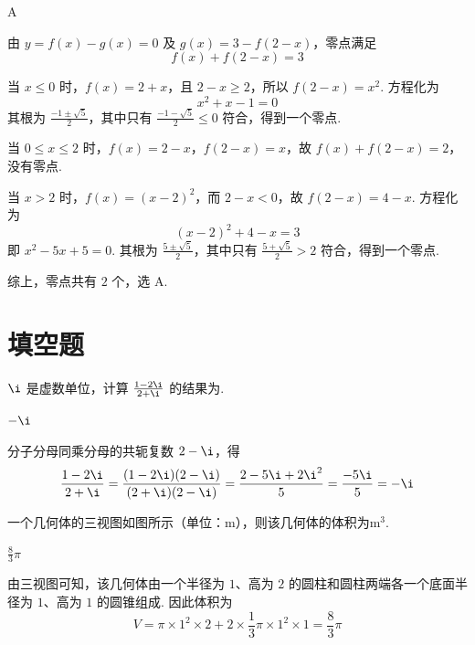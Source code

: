\begin{answer}
A
\end{answer}

\begin{solution}
由 \(y=f(x)-g(x)=0\) 及 \(g(x)=3-f(2-x)\)，零点满足
\[
f(x)+f(2-x)=3
\]

当 \(x\leqslant0\) 时，\(f(x)=2+x\)，且 \(2-x\geqslant2\)，所以 \(f(2-x)=x^2\). 方程化为
\[
x^2+x-1=0
\]
其根为 \(\frac{-1\pm\sqrt5}{2}\)，其中只有 \(\frac{-1-\sqrt5}{2}\leqslant0\) 符合，得到一个零点.

当 \(0\leqslant x\leqslant2\) 时，\(f(x)=2-x\)，\(f(2-x)=x\)，故 \(f(x)+f(2-x)=2\)，没有零点.

当 \(x>2\) 时，\(f(x)=(x-2)^2\)，而 \(2-x<0\)，故 \(f(2-x)=4-x\). 方程化为
\[
(x-2)^2+4-x=3
\]
即 \(x^2-5x+5=0\). 其根为 \(\frac{5\pm\sqrt5}{2}\)，其中只有 \(\frac{5+\sqrt5}{2}>2\) 符合，得到一个零点.

综上，零点共有 \(2\) 个，选 A.
\end{solution}

\section{填空题}

\begin{problem}
\(\i\) 是虚数单位，计算 \( \frac{1-2\i}{2+\i} \) 的结果为\fillinblank{}.
\end{problem}

\begin{answer}
\(-\i\)
\end{answer}

\begin{solution}
分子分母同乘分母的共轭复数 \(2-\i\)，得
\[
\frac{1-2\i}{2+\i}=\frac{(1-2\i)(2-\i)}{(2+\i)(2-\i)}=\frac{2-5\i+2\i^2}{5}=\frac{-5\i}{5}=-\i
\]
\end{solution}

\begin{problem}
一个几何体的三视图如图所示（单位：\(\mathrm{m}\)），则该几何体的体积为\fillinblank{}\(\mathrm{m}^{3}\).

\end{problem}

\begin{answer}
\(\frac{8}{3}\pi\)
\end{answer}

\begin{solution}
由三视图可知，该几何体由一个半径为 \(1\)、高为 \(2\) 的圆柱和圆柱两端各一个底面半径为 \(1\)、高为 \(1\) 的圆锥组成. 因此体积为
\[
V=\pi\times1^2\times2+2\times\frac13\pi\times1^2\times1=\frac83\pi
\]
\end{solution}

